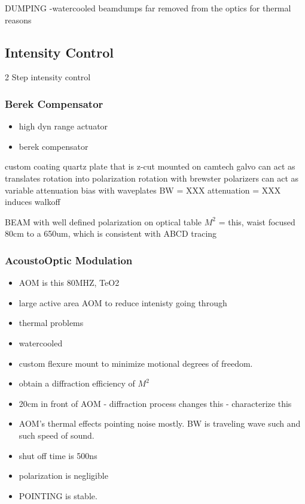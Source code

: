 \documentclass[twocolumn,aps,pra,showpacs,preprintnumbers,bibnotes]{revtex4-1}
\begin{document}
DUMPING
-watercooled beamdumps far removed from the optics for thermal reasons
\subsection{Intensity Control}
2 Step intensity control

\subsubsection{Berek Compensator}
\begin{itemize}
\item high dyn range actuator
\item berek compensator
\end{itemize}

custom coating quartz plate that is z-cut mounted on camtech galvo
can act as translates rotation into polarization rotation
with brewster polarizers can act as variable attenuation
bias with waveplates
BW = XXX
attenuation = XXX
induces walkoff

BEAM with well defined polarization on optical table 
$M^2$ = this, waist focused 80cm to a 650um, which is consistent with ABCD tracing

\subsubsection{AcoustoOptic Modulation}

\begin{itemize}
    \item AOM is this 80MHZ, TeO2
    \item large active area AOM to reduce intenisty going through
    \item thermal problems
    \item watercooled
    \item custom flexure mount to minimize motional degrees of freedom.
    \item obtain a diffraction efficiency of $M^2$
    \item 20cm in front of AOM - diffraction process changes this - characterize this
    \item AOM's thermal effects pointing noise mostly. BW is traveling wave such and such speed of sound.
    \item shut off time is 500ns
    \item polarization is negligible
    \item POINTING is stable.
\end{itemize}
\end{document}
